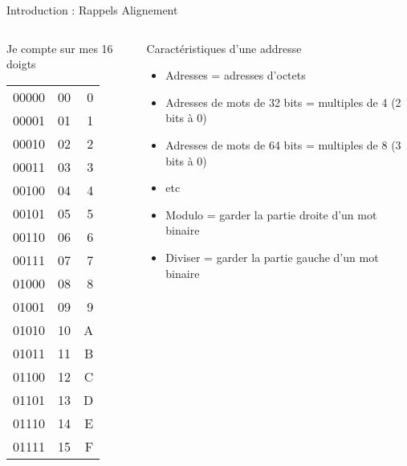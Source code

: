 \begin{Frame}{Introduction : Rappels Alignement}
 \begin{columns}[t]
  \begin{column}{\BW}
    \begin{block}{Je compte sur mes 16 doigts}\tiny
      \begin{tabular}{|r r r|}\hline
        00000&00 &0                             \\
        00001&01 &1                             \\
        00010&02 &2                             \\
        00011&03 &3                             \\ \hline
        00100&04 &4                             \\
        00101&05 &5                             \\
        00110&06 &6                             \\
        00111&07 &7                             \\ \hline \hline
        01000&08 &8                             \\
        01001&09 &9                             \\
        01010&10&A                             \\
        01011&11&B                             \\ \hline
        01100&12&C                             \\
        01101&13&D                             \\
        01110&14&E                             \\
        01111&15&F                             \\ \hline
      \end{tabular}
    \end{block}
  \end{column}
  \begin{column}{\BW}
    \begin{block}{Caractéristiques d'une addresse}
      \begin{itemize}
      \item Adresses = adresses d'octets
      \item Adresses de mots de 32 bits = multiples de 4 (2
        bits à 0)
      \item Adresses de mots de 64 bits = multiples de 8 (3
        bits à 0)
      \item etc
      \end{itemize}
    \end{block}
    \begin{block}{}
      \begin{itemize}
      \item  Modulo = garder la partie droite d'un mot binaire
      \item  Diviser = garder la partie gauche d'un mot binaire
      \end{itemize}
    \end{block}
  \end{column}

 \end{columns}
\end{Frame}
